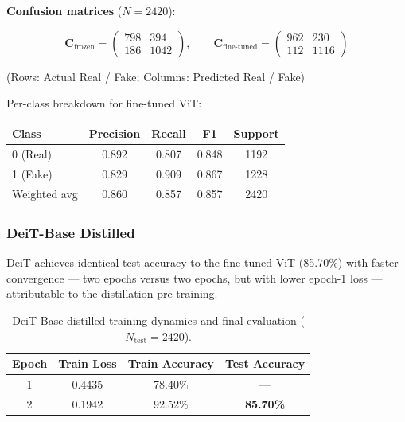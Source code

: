 \documentclass[12pt, a4paper]{article}
\begin{document}
\noindent\textbf{Confusion matrices} ($N=2420$):

\begin{equation*}
\mathbf{C}_{\text{frozen}} =
\begin{pmatrix} 798 & 394 \\ 186 & 1042 \end{pmatrix},
\qquad
\mathbf{C}_{\text{fine-tuned}} =
\begin{pmatrix} 962 & 230 \\ 112 & 1116 \end{pmatrix}
\end{equation*}
\begin{center}
(Rows: Actual Real / Fake;\; Columns: Predicted Real / Fake)
\end{center}

Per-class breakdown for fine-tuned ViT:
\begin{center}
\begin{tabular}{lcccc}
\toprule
\textbf{Class} & \textbf{Precision} & \textbf{Recall} & \textbf{F1} & \textbf{Support} \\
\midrule
0 (Real) & 0.892 & 0.807 & 0.848 & 1192 \\
1 (Fake) & 0.829 & 0.909 & 0.867 & 1228 \\
Weighted avg & 0.860 & 0.857 & 0.857 & 2420 \\
\bottomrule
\end{tabular}
\end{center}

\subsubsection{DeiT-Base Distilled}

DeiT achieves identical test accuracy to the fine-tuned ViT (85.70\%) with faster
convergence — two epochs versus two epochs, but with lower epoch-1 loss —
attributable to the distillation pre-training.

\begin{table}[H]
\centering
\caption{DeiT-Base distilled training dynamics and final evaluation ($N_{\text{test}}=2420$).}
\label{tab:deit}
\begin{tabular}{cccc}
\toprule
\textbf{Epoch} & \textbf{Train Loss} & \textbf{Train Accuracy} & \textbf{Test Accuracy} \\
\midrule
1 & 0.4435 & 78.40\% & — \\
2 & 0.1942 & 92.52\% & \textbf{85.70\%} \\
\bottomrule
\end{tabular}
\end{table}
\end{document}
